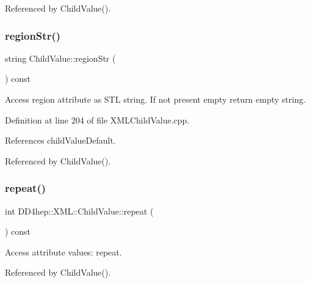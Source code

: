 Referenced by Child\+Value().

\hypertarget{struct_d_d4hep_1_1_x_m_l_1_1_child_value_aa0062a28cc4f40dc67a8ff58e70b53c6}{}\label{struct_d_d4hep_1_1_x_m_l_1_1_child_value_aa0062a28cc4f40dc67a8ff58e70b53c6} 
\subsubsection{\texorpdfstring{region\+Str()}{regionStr()}}
{\footnotesize\ttfamily string Child\+Value\+::region\+Str (\begin{DoxyParamCaption}{ }\end{DoxyParamCaption}) const}



Access region attribute as S\+TL string. If not present empty return empty string. 



Definition at line 204 of file X\+M\+L\+Child\+Value.\+cpp.



References child\+Value\+Default.



Referenced by Child\+Value().

\hypertarget{struct_d_d4hep_1_1_x_m_l_1_1_child_value_aaa9f9cd0cfae3cdfd833ff2f5f685f2d}{}\label{struct_d_d4hep_1_1_x_m_l_1_1_child_value_aaa9f9cd0cfae3cdfd833ff2f5f685f2d} 
\subsubsection{\texorpdfstring{repeat()}{repeat()}}
{\footnotesize\ttfamily int D\+D4hep\+::\+X\+M\+L\+::\+Child\+Value\+::repeat (\begin{DoxyParamCaption}{ }\end{DoxyParamCaption}) const}



Access attribute values\+: repeat. 



Referenced by Child\+Value().

\hypertarget{struct_d_d4hep_1_1_x_m_l_1_1_child_value_a174432ef2e1fa18e1c92a7b5d7bdba4c}{}\label{struct_d_d4hep_1_1_x_m_l_1_1_child_value_a174432ef2e1fa18e1c92a7b5d7bdba4c} 
